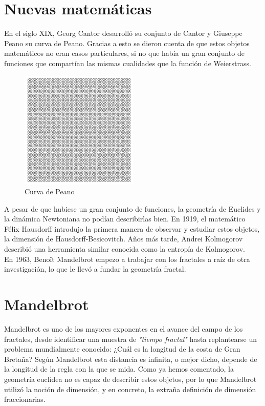 \section{Nuevas matemáticas}

\noindent En el siglo XIX, Georg Cantor desarrolló su conjunto de Cantor y 
Giuseppe Peano su curva de Peano. Gracias a esto se dieron cuenta de que estos objetos matemáticos no eran casos particulares, si no que había un gran conjunto de funciones que compartían las mismas cualidades que la función de Weierstrass. \cite{complejidad}\\ 

\begin{figure}[H]
    \centering
    \includegraphics[width=0.5\textwidth]{figures/peano-curve.jpg}
    \caption{Curva de Peano}
    \label{fig:peano-curve}
\end{figure}


\noindent A pesar de que hubiese un gran conjunto de funciones, la geometría de Euclides y la dinámica Newtoniana no podían describirlas bien. En 1919, el matemático Félix Hausdorff introdujo la primera manera de observar y estudiar estos objetos, la dimensión de Hausdorff-Besicovitch. Años más tarde, Andrei Kolmogorov describió una herramienta similar conocida como la entropía de Kolmogorov. \cite{complejidad} \\

\noindent En 1963, Benoît Mandelbrot empezo a trabajar con los fractales a raíz de otra investigación, lo que le llevó a fundar la geometría fractal. \cite{complejidad}

\section{Mandelbrot}

\noindent Mandelbrot es uno de los mayores exponentes en el avance del campo de los fractales, desde identificar una muestra de \textit{"tiempo fractal"} hasta replantearse un problema mundialmente conocido: ¿Cuál es la longitud de la costa de Gran Bretaña? Según Mandelbrot esta distancia es infinita, o mejor dicho, depende de la longitud de la regla con la que se mida. Como ya hemos comentado, la geometría euclídea no es capaz de describir estos objetos, por lo que Mandelbrot utilizó la noción de dimensión, y en concreto, la extraña definición de dimensión fraccionarias. \cite{complejidad}\\

